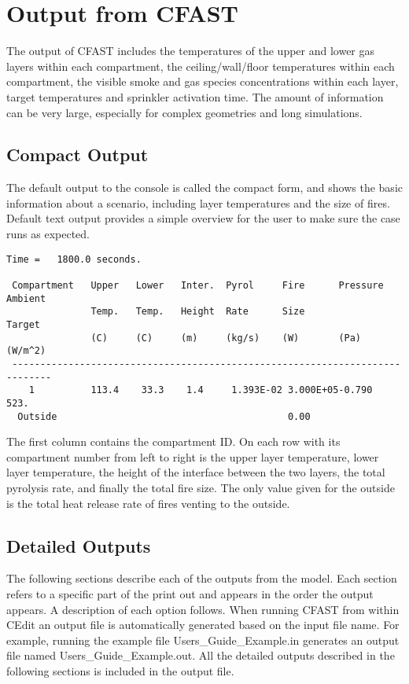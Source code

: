 \chapter{Output from CFAST}
\label{Output_Chapter}

The output of CFAST includes the temperatures of the upper and lower gas layers within each compartment, the ceiling/wall/floor temperatures within each compartment, the visible smoke and gas species concentrations within each layer, target temperatures and sprinkler activation time.  The amount of information can be very large, especially for complex geometries and long simulations.

\section{Compact Output}

The default output to the console is called the compact form, and shows the basic information about a scenario, including layer temperatures and the size of fires. Default text output provides a simple overview for the user to make sure the case runs as expected.
\begin{lstlisting}[basicstyle=\scriptsize]
 Time =   1800.0 seconds.

 Compartment   Upper   Lower   Inter.  Pyrol     Fire      Pressure  Ambient
               Temp.   Temp.   Height  Rate      Size                Target
               (C)     (C)     (m)     (kg/s)    (W)       (Pa)      (W/m^2)
 -----------------------------------------------------------------------------
    1          113.4    33.3    1.4     1.393E-02 3.000E+05-0.790      523.
  Outside                                         0.00
\end{lstlisting}
The first column contains the compartment ID.  On each row with its compartment number from left to right is the upper layer temperature, lower layer temperature, the height of the interface between the two layers, the total pyrolysis rate, and finally the total fire size.  The only value given for the outside is the total heat release rate of fires venting to the outside.

\section{Detailed Outputs}

The following sections describe each of the outputs from the model.  Each section refers to a specific part of the print out and appears in the order the output appears. A description of each option follows. When running CFAST from within CEdit an output file is automatically generated based on the input file name. For example, running the example file  {\ct Users\_Guide\_Example.in} generates an output file named  {\ct Users\_Guide\_Example.out}. All the detailed outputs described in the following sections is included in the output file.

